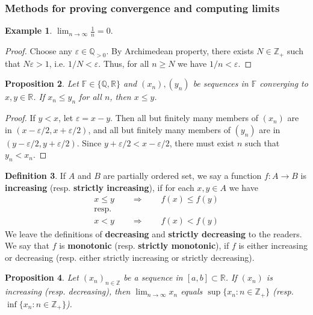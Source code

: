 \documentclass[12pt,b5paper,notitlepage]{article}
\theoremstyle{definition}
\newtheorem{df}{Definition}[section]
\newtheorem{eg}[df]{Example}
\theoremstyle{plain}
\newtheorem{pp}[df]{Proposition}
\newcommand{\Zbb}{\mathbb Z}
\newcommand{\Qbb}{\mathbb Q}
\newcommand{\Rbb}{\mathbb R}
\newcommand{\Fbb}{\mathbb F}
\newcommand{\dps}{\displaystyle}
\newcommand{\eps}{\varepsilon}
\numberwithin{equation}{section}
\begin{document}
\subsubsection{Methods for proving convergence and computing limits}

\begin{eg}
$\dps \lim_{n\rightarrow\infty}\frac 1n=0$.
\end{eg}


\begin{proof}
Choose any $\varepsilon\in\Qbb_{>0}$. By Archimedean property, there exists $N\in\Zbb_+$ such that $N\varepsilon>1$, i.e. $1/N<\varepsilon$. Thus, for all $n\geq N$ we have $1/n<\varepsilon$.
\end{proof}

\begin{pp}
Let $\Fbb\in\{\Qbb,\Rbb\}$ and $(x_n),(y_n)$ be sequences in $\Fbb$ converging to $x,y\in\Rbb$. If $x_n\leq y_n$ for all $n$, then $x\leq y$.
\end{pp}

\begin{proof}
If $y<x$, let $\varepsilon=x-y$. Then all but finitely many members of $(x_n)$ are in $(x-\varepsilon/2,x+\varepsilon/2)$, and all but finitely many members of $(y_n)$ are in $(y-\varepsilon/2,y+\varepsilon/2)$. Since $y+\eps/2<x-\eps/2$, there must exist $n$ such that $y_n<x_n$.
\end{proof}


\begin{df}
If $A$ and $B$ are partially ordered set, we say a function $f:A\rightarrow B$ is \textbf{increasing}   (resp. \textbf{strictly increasing}), if for each $x,y\in A$ we have
\begin{gather*}
x\leq y\qquad\Longrightarrow\qquad f(x)\leq f(y)\\
\text{resp.}\\
x<y\qquad\Longrightarrow \qquad f(x)<f(y)
\end{gather*}
We leave the definitions of \textbf{decreasing} and \textbf{strictly decreasing} to the readers. We say that $f$ is   \textbf{monotonic} (resp. \textbf{strictly monotonic}), if $f$ is either increasing or decreasing (resp. either strictly increasing or strictly decreasing).
\end{df}


\begin{pp}\label{lb57}
Let $(x_n)_{n\in\Zbb}$ be a sequence in $[a,b]\subset\Rbb$. If $(x_n)$ is increasing (resp. decreasing), then $\dps\lim_{n\rightarrow \infty}x_n$ equals $\dps\sup\{x_n:n\in\Zbb_+\}$ (resp. $\dps\inf\{x_n:n\in\Zbb_+\}$).
\end{pp}
\end{document}
